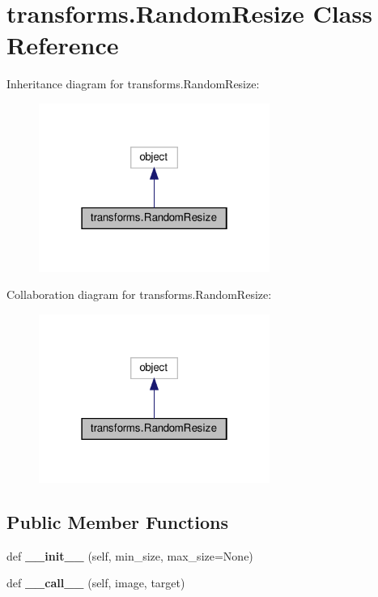 \hypertarget{classtransforms_1_1RandomResize}{}\section{transforms.\+Random\+Resize Class Reference}
\label{classtransforms_1_1RandomResize}


Inheritance diagram for transforms.\+Random\+Resize\+:
\nopagebreak
\begin{figure}[H]
\begin{center}
\leavevmode
\includegraphics[width=214pt]{classtransforms_1_1RandomResize__inherit__graph}
\end{center}
\end{figure}


Collaboration diagram for transforms.\+Random\+Resize\+:
\nopagebreak
\begin{figure}[H]
\begin{center}
\leavevmode
\includegraphics[width=214pt]{classtransforms_1_1RandomResize__coll__graph}
\end{center}
\end{figure}
\subsection*{Public Member Functions}
\begin{DoxyCompactItemize}
\item 
\mbox{\label{classtransforms_1_1RandomResize_a0f9343c892f6a93f7ba022c35d4add6a}} 
def {\bfseries \+\_\+\+\_\+init\+\_\+\+\_\+} (self, min\+\_\+size, max\+\_\+size=None)
\item 
\mbox{\label{classtransforms_1_1RandomResize_a72c1bcf368f8b2ed2774dd53557858e1}} 
def {\bfseries \+\_\+\+\_\+call\+\_\+\+\_\+} (self, image, target)
\end{DoxyCompactItemize}
